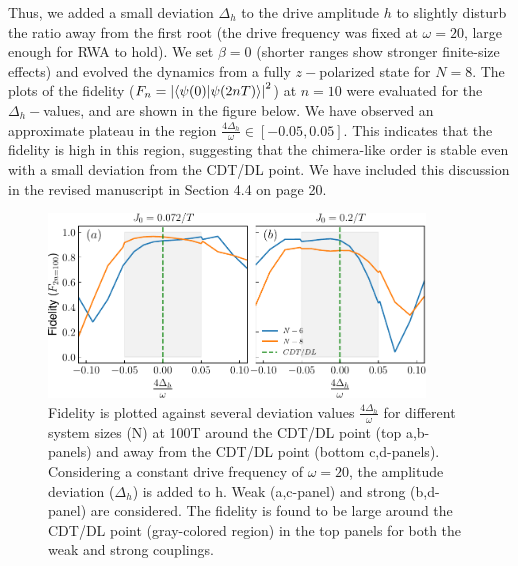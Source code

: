 \documentclass[aps,prb,reprint,showpacs,floatfix,superscriptaddress, onecolumn, nofootinbib, 10pt]{revtex4-2}
\begin{document}
\begin{enumerate}
\begin{enumerate}
\begin{enumerate}
{			Thus, we added a small deviation $\Delta_h$  to the drive amplitude $h$ to slightly disturb the ratio away from the first root (the  drive frequency was fixed at $\omega = 20$, large enough for RWA to hold). We set $\beta=0$ (shorter ranges show stronger finite-size effects) and evolved the dynamics from a fully $z-$polarized state for $N = 8$.
			The plots of the fidelity ($F_n = \abs{\braket{\psi(0)}{\psi (2nT)}}^2$) at $n=10$ were evaluated for the $\Delta_h-$values, and are shown in the figure below. 
			We have observed an approximate plateau in the region $\displaystyle\frac{4\Delta_h}{\omega} \in[-0.05, 0.05]$. This indicates that the fidelity is high in this region, suggesting that the chimera-like order is stable even with a small deviation from the CDT/DL point. We have included this discussion in the revised manuscript in Section 4.4 on page 20.	
			\begin{figure}[h!]
				\begin{center}
					\includegraphics[width=10cm]{./figs/figure14.pdf}
				\end{center}
				\caption{Fidelity is plotted against several deviation values $\frac{4\Delta_h}{\omega}$ for different system sizes (N) at 100T around the CDT/DL point (top a,b-panels) and away from the CDT/DL point (bottom c,d-panels). Considering a constant drive frequency of $\omega= 20$, the amplitude deviation ($\Delta_h$) is added to h. Weak (a,c-panel) and strong (b,d-panel) are considered. The fidelity is found to be large around the CDT/DL point (gray-colored region) in the top panels for both the weak and strong couplings.}
				\label{Fig:aroundCDT}
			\end{figure}
		
			}
		\end{enumerate}
		

\end{enumerate}
\end{enumerate}
\end{document}
